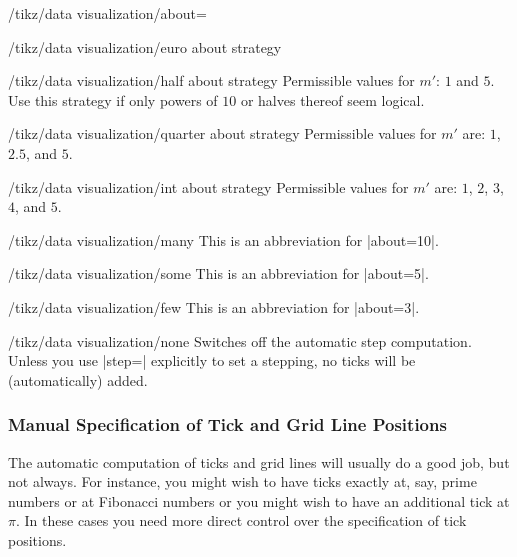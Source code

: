 \begin{key}{/tikz/data visualization/about=}
\begin{key}{/tikz/data visualization/euro about strategy}
  \end{key}

  \begin{key}{/tikz/data visualization/half about strategy}
    Permissible values for $m'$: $1$ and $5$. Use this
    strategy if only powers of $10$ or halves thereof seem logical.

  \end{key}

  \begin{key}{/tikz/data visualization/quarter about strategy}
    Permissible values for $m'$ are: $1$, $2.5$, and $5$.

  \end{key}

  \begin{key}{/tikz/data visualization/int about strategy}
    Permissible values for $m'$ are: $1$, $2$, $3$, $4$, and $5$.

  \end{key}
\end{key}

\begin{key}{/tikz/data visualization/many}
  This is an abbreviation for |about=10|.
\end{key}

\begin{key}{/tikz/data visualization/some}
  This is an abbreviation for |about=5|.
\end{key}

\begin{key}{/tikz/data visualization/few}
  This is an abbreviation for |about=3|.
\end{key}

\begin{key}{/tikz/data visualization/none}
  Switches off the automatic step computation. Unless you use |step=|
  explicitly to set a stepping, no ticks will be (automatically)
  added.
\end{key}



\subsubsection{Manual Specification of Tick and Grid Line Positions}

The automatic computation of ticks and grid lines will usually do a
good job, but not always. For instance, you might wish to have ticks
exactly at, say, prime numbers or at Fibonacci numbers or you might
wish to have an additional tick at $\pi$. In these cases you need more
direct control over the specification of tick positions.

